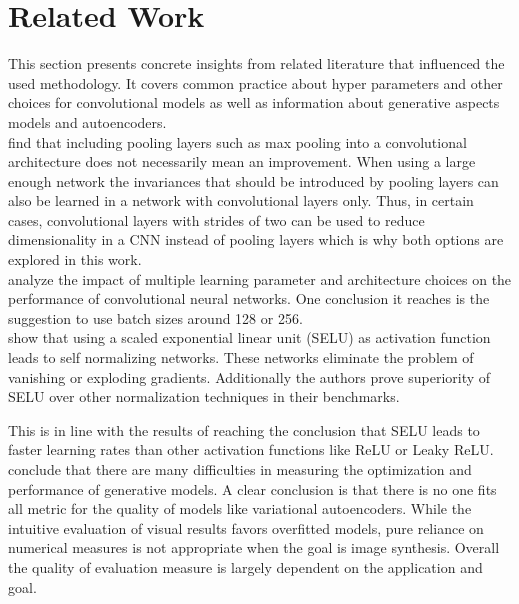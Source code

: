 \section{Related Work} \label{related_work_general_architecture}

This section presents concrete insights from related literature that influenced the used methodology.
It covers common practice about
hyper parameters and other choices for convolutional models as well as information about 
generative aspects models and autoencoders.\\

\textcite{2015-springenberg-striving}
find that including pooling layers such as max pooling into a convolutional architecture does not 
necessarily mean an improvement. When using a large enough network the invariances that should be
introduced by pooling layers can also be learned in a network with convolutional layers only. Thus, in certain cases,
convolutional layers with strides of two can be used to reduce dimensionality in a CNN instead of pooling layers
which is why both options are explored in this work.
\\

\textcite{2016-mishkin-systematic} analyze
the impact of multiple learning parameter and architecture choices on the performance of convolutional neural networks.
One conclusion it reaches is the suggestion to use batch sizes around 128 or 256.\\

\textcite{2017-klambauer-selu} show that using
a scaled exponential linear unit (SELU) as activation function leads to self normalizing networks. These networks 
eliminate the problem of vanishing or exploding gradients. Additionally the authors prove superiority of SELU 
over other normalization techniques in their benchmarks. 

This is in line with the results of \textcite{2018-Pedamonti-comparison} reaching the conclusion that SELU leads
to faster learning rates than other activation functions like ReLU or Leaky ReLU.\\

\textcite{2015-theis-generative}
conclude that there are many difficulties in
measuring the optimization and performance of generative models. A clear conclusion is that there is no 
one fits all metric for the quality of models like variational autoencoders. While the intuitive evaluation
of visual results favors overfitted models, pure reliance on numerical measures is not appropriate when the
goal is image synthesis. Overall the quality of evaluation measure is largely dependent on the application
and goal.\\



